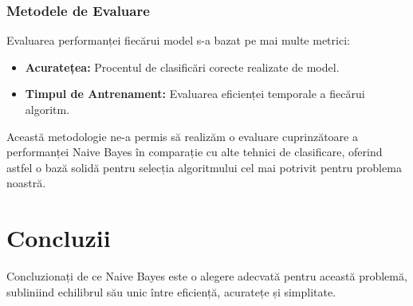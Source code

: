 \documentclass{article}
\begin{document}
\subsubsection{Metodele de Evaluare}

Evaluarea performanței fiecărui model s-a bazat pe mai multe metrici:
\begin{itemize}
    \item \textbf{Acuratețea:} Procentul de clasificări corecte realizate de model.
    \item \textbf{Timpul de Antrenament:} Evaluarea eficienței temporale a fiecărui algoritm.
\end{itemize}

Această metodologie ne-a permis să realizăm o evaluare cuprinzătoare a performanței Naive Bayes în comparație cu alte tehnici de clasificare, oferind astfel o bază solidă pentru selecția algoritmului cel mai potrivit pentru problema noastră.



\section{Concluzii}
Concluzionați de ce Naive Bayes este o alegere adecvată pentru această problemă, subliniind echilibrul său unic între eficiență, acuratețe și simplitate.
\end{document}
